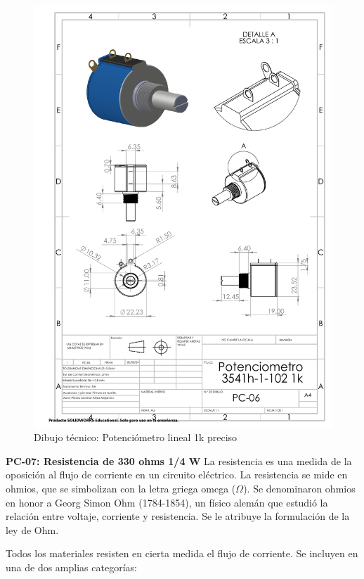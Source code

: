     \begin{figure}[H]
        \centering
        \includegraphics[trim = {22mm 70mm 21mm 95mm},clip,scale=0.4]{22/Img/potenciometroDibujo.PDF}
        \caption{Dibujo técnico: Potenciómetro lineal 1k preciso}
        \label{fig:potenciometro}
    \end{figure}
    
    
    \textbf{PC-07: Resistencia de 330 ohms 1/4 W }
    La resistencia es una medida de la oposición al flujo de corriente en un circuito eléctrico. La resistencia se mide en ohmios, que se simbolizan con la letra griega omega ($\Omega$). Se denominaron ohmios en honor a Georg Simon Ohm (1784-1854), un físico alemán que estudió la relación entre voltaje, corriente y resistencia. Se le atribuye la formulación de la ley de Ohm.
    
    
    Todos los materiales resisten en cierta medida el flujo de corriente. Se incluyen en una de dos amplias categorías:
    
